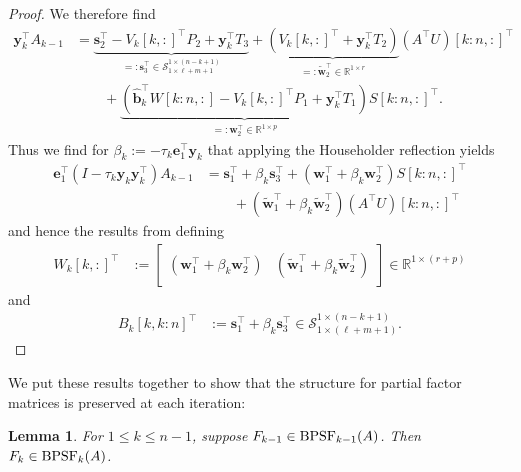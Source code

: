 \documentclass[a4paper,fleqn]{cas-sc}
\newtheorem{lemma}{Lemma}
\def\bbR{{\mathbb R}}
\def\calS{{\mathcal S}}
\def\bfy{{\mathbf y}}
\def\bfe{{\mathbf e}}
\def\bfb{{\mathbf b}}
\def\bfs{{\mathbf s}}
\def\bfw{{\mathbf w}}
\begin{document}
\begin{proof}
We therefore find
\begin{align*}
\bfy_k^\top A_{k-1} &= 
\underbrace{\bfs_2^\top - V_k[k,:]^\top P_2+  \bfy_k^\top T_3}_{=: \bfs_3^\top \in \calS_{1 \times \ell+m+1}^{1 \times (n-k+1)}} + \underbrace{(V_k[k,:]^\top  + \bfy_k^\top T_2)}_{=: \tilde \bfw_2^\top \in \bbR^{1 \times r}} (A^\top U)[k\!:\!n,:]^\top\\
&\qquad + 
  \underbrace{(\hat \bfb_k^\top W[k\!:\!n,:] - V_k[k,:]^\top P_1 + \bfy_k^\top T_1)}_{=: \bfw_2^\top \in \bbR^{1 \times p}}  S[k\!:\!n,:]^\top.
\end{align*}
Thus we find for $\beta_k:= -\tau_k \bfe_1^\top \bfy_k$ that applying the Householder reflection yields
\begin{align*}
    \bfe_1^\top (I - \tau_k \bfy_k \bfy_k^\top)A_{k-1} &=
    \bfs_1^\top  + \beta_k \bfs_3^\top + (\bfw_1^\top + \beta_k \bfw_2^\top) S[k\!:\!n,:]^\top \\
    &\qquad  + (\tilde \bfw_1^\top + \beta_k \tilde \bfw_2^\top) (A^\top U)[k\!:\!n,:]^\top
\end{align*}
and hence the results from defining
\begin{align}\label{eq:row_updtae_1}
W_k[k,:]^\top &:= \begin{bmatrix} 
    (\bfw_1^\top + \beta_k \bfw_2^\top) & (\tilde \bfw_1^\top + \beta_k \tilde \bfw_2^\top) \end{bmatrix} \in \bbR^{1 \times (r+p)}
\end{align}
and 
\begin{align}\label{eq:row_updtae_2}
B_k[k,k\!:\!n]^\top &:= \bfs_1^\top  + \beta_k \bfs_3^\top  \in \calS_{1 \times (\ell+m+1)}^{1 \times (n-k+1)}.
\end{align}



\end{proof}

We put these results together to show that the structure for partial factor matrices is preserved at each iteration:

\begin{lemma} \label{Lemma:Structure_preserve}
    For $1\leq k \leq n-1$, suppose $F_{k-1}  \in {\rm BPSF}_{k-1}(A)$. Then $F_k \in {\rm BPSF}_k(A)$. 
\end{lemma}
\end{document}
